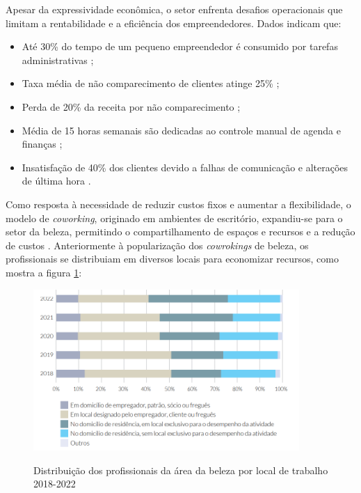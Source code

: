 \FloatBarrier

Apesar da expressividade econômica, o setor enfrenta desafios operacionais que limitam a rentabilidade e a eficiência dos empreendedores. Dados indicam que: 

\begin{itemize}
	\item Até 30\% do tempo de um pequeno empreendedor é consumido por tarefas administrativas \cite{senac2022};
	\item Taxa média de não comparecimento de clientes atinge 25\% \cite{booksy2022};
	\item Perda de 20\% da receita por não comparecimento \cite{abihpec2021};
	\item Média de 15 horas semanais são dedicadas ao controle manual de agenda e finanças \cite{fgv2020};
	\item Insatisfação de 40\% dos clientes devido a falhas de comunicação e alterações de última hora \cite{mindminers2022}.
\end{itemize}

Como resposta à necessidade de reduzir custos fixos e aumentar a flexibilidade, o modelo de \emph{coworking}, originado em ambientes de escritório, expandiu-se para o setor da beleza, permitindo o compartilhamento de espaços e recursos e a redução de custos \cite{sebrae_coworking,sebraesc2025}. Anteriormente à popularização dos \emph{cowrokings} de beleza, os profissionais se distribuiam em diversos locais para economizar recursos, como mostra a figura \ref{fig:Distribuição_locais}:

\begin{figure}[htb]
	\centering
	\caption{Distribuição dos profissionais da área da beleza por local de trabalho 2018-2022}
	\includegraphics[width=0.9\textwidth]{cap01-Introducao/Images/1.3_local_trabalho_profissionais}
	\label{fig:Distribuição_locais}
\end{figure}

